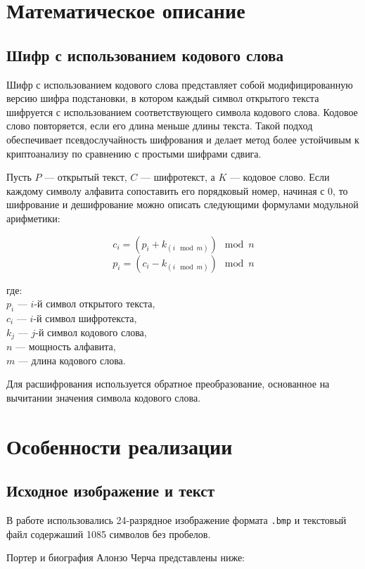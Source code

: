 \documentclass[10pt,a4paper,final]{article} %
\begin{document}
\newpage
\section{Математическое описание}
\subsection{Шифр с использованием кодового слова}

Шифр с использованием кодового слова представляет собой модифицированную версию шифра подстановки, в котором каждый символ открытого текста шифруется с использованием соответствующего символа кодового слова. Кодовое слово повторяется, если его длина меньше длины текста. Такой подход обеспечивает псевдослучайность шифрования и делает метод более устойчивым к криптоанализу по сравнению с простыми шифрами сдвига.

Пусть $P$ — открытый текст, $C$ — шифротекст, а $K$ — кодовое слово. Если каждому символу алфавита сопоставить его порядковый номер, начиная с 0, то шифрование и дешифрование можно описать следующими формулами модульной арифметики:

\[
c_i = (p_i + k_{(i \mod m)}) \mod n
\]
\[
p_i = (c_i - k_{(i \mod m)}) \mod n
\]

где: \\
$p_i$ — $i$-й символ открытого текста, \\
$c_i$ — $i$-й символ шифротекста, \\
$k_j$ — $j$-й символ кодового слова, \\
$n$ — мощность алфавита, \\
$m$ — длина кодового слова.

Для расшифрования используется обратное преобразование, основанное на вычитании значения символа кодового слова.




\newpage
\section{Особенности реализации}
\subsection{Исходное изображение и текст}

В работе использовались 24-разрядное изображение формата \texttt{.bmp}  и текстовый файл содержаший 1085 символов без пробелов. 

Портер и биография Алонзо Черча представлены ниже:\\
\end{document}
